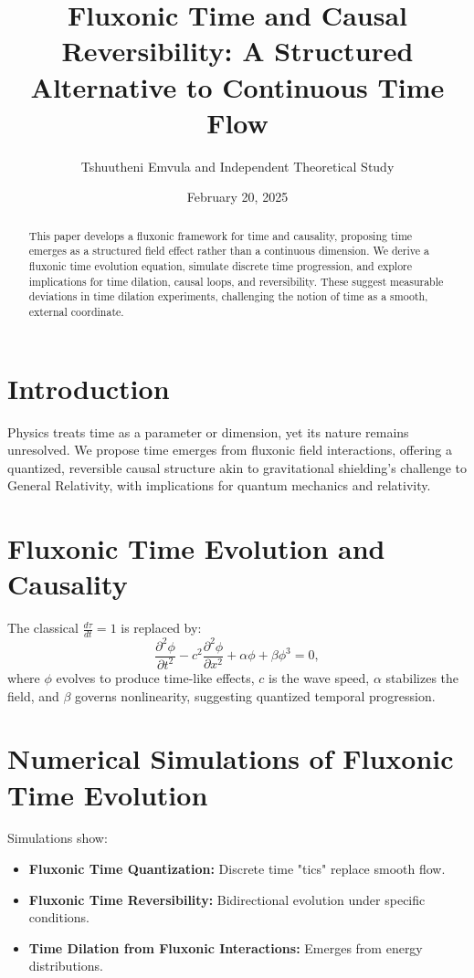 \documentclass{article}
\title{Fluxonic Time and Causal Reversibility: A Structured Alternative to Continuous Time Flow}
\author{Tshuutheni Emvula and Independent Theoretical Study}
\date{February 20, 2025}
\begin{document}
\maketitle

\begin{abstract}
This paper develops a fluxonic framework for time and causality, proposing time emerges as a structured field effect rather than a continuous dimension. We derive a fluxonic time evolution equation, simulate discrete time progression, and explore implications for time dilation, causal loops, and reversibility. These suggest measurable deviations in time dilation experiments, challenging the notion of time as a smooth, external coordinate.
\end{abstract}

\section{Introduction}
Physics treats time as a parameter or dimension, yet its nature remains unresolved. We propose time emerges from fluxonic field interactions, offering a quantized, reversible causal structure akin to gravitational shielding’s challenge to General Relativity, with implications for quantum mechanics and relativity.

\section{Fluxonic Time Evolution and Causality}
The classical \(\frac{d \tau}{d t} = 1\) is replaced by:
\begin{equation}
\frac{\partial^2 \phi}{\partial t^2} - c^2 \frac{\partial^2 \phi}{\partial x^2} + \alpha \phi + \beta \phi^3 = 0,
\end{equation}
where \(\phi\) evolves to produce time-like effects, \(c\) is the wave speed, \(\alpha\) stabilizes the field, and \(\beta\) governs nonlinearity, suggesting quantized temporal progression.

\section{Numerical Simulations of Fluxonic Time Evolution}
Simulations show:
\begin{itemize}
    \item \textbf{Fluxonic Time Quantization:} Discrete time "tics" replace smooth flow.
    \item \textbf{Fluxonic Time Reversibility:} Bidirectional evolution under specific conditions.
    \item \textbf{Time Dilation from Fluxonic Interactions:} Emerges from energy distributions.
\end{itemize}
\end{document}
